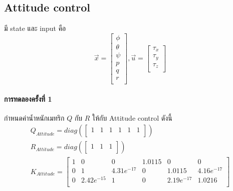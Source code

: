 \subsection{Attitude control}
มี state และ input คือ
\begin{equation}
    {\vec{x}=\begin{bmatrix}
        \phi \\ \theta \\ \psi \\ p \\ q \\ r \\
    \end{bmatrix}, \vec{u} = \begin{bmatrix}
        \tau_x \\ \tau_y \\ \tau_z \\
    \end{bmatrix}}
\end{equation}

\paragraph*{การทดลองครั้งที่ 1}
กำหนดค่าน้ำหนักเมทริก $Q$ กับ $R$ ให้กับ Attitude control ดังนี้
\begin{equation}
    \begin{array}{c}
    {Q_{Attitude}=diag(\begin{bmatrix}
        1 & 1 & 1 & 1 & 1 & 1\\
    \end{bmatrix})}\\[10pt]
    {R_{Attitude} = diag(\begin{bmatrix}
        1 & 1 & 1\\
    \end{bmatrix})}\\[10pt]
    {K_{Attitude} = \begin{bmatrix}
        1 & 0 & 0 & 1.0115 & 0 & 0 \\
        0 & 1 & 4.31e^{-17} & 0 & 1.0115 & 4.16e^{-17} \\
        0 & 2.42e^{-15} & 1 & 0 & 2.19e^{-17} & 1.0216 \\
    \end{bmatrix}} \\[10pt]
    \end{array}
\end{equation}

